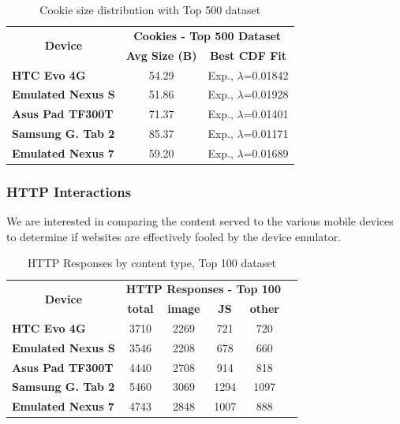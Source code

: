 \documentclass{acm_proc_article-sp}
\begin{document}
\begin{table}[htbp]
  \centering
  \caption{Cookie size distribution with Top 500 dataset}
    \begin{tabular}{|c|c|c|}
    \hline
    \multicolumn{1}{|c|}{\multirow{2}[4]{*}{\textbf{Device}}} & \multicolumn{2}{|c|}{\textbf{Cookies - Top 500 Dataset}} \\ \cline{2-3}
    \multicolumn{1}{|c|}{} & \textbf{Avg Size (B)} & \textbf{Best CDF Fit} \\ \hline
    \multicolumn{1}{|l|}{\textbf{HTC Evo 4G}} & 54.29 & Exp., $\lambda$=0.01842 \\
    \multicolumn{1}{|l|}{\textbf{Emulated Nexus S}} & 51.86 & Exp., $\lambda$=0.01928 \\
    \multicolumn{1}{|l|}{\textbf{Asus Pad TF300T}} & 71.37 & Exp., $\lambda$=0.01401 \\
    \multicolumn{1}{|l|}{\textbf{Samsung G. Tab 2}} & 85.37 & Exp., $\lambda$=0.01171 \\
    \multicolumn{1}{|l|}{\textbf{Emulated Nexus 7}} & 59.20 & Exp., $\lambda$=0.01689 \\ \hline
    \end{tabular}%
  \label{tab:cookie_sizes}%
\end{table}%

\subsubsection{HTTP Interactions}

We are interested in comparing the content served to the various mobile devices to determine if websites are effectively fooled by the device emulator.

\begin{table}[htbp]
  \centering
  \caption{HTTP Responses by content type, Top 100 dataset}
    \begin{tabular}{|c|c|c|c|c|c|}
    \hline
    \multicolumn{1}{|c|}{\multirow{2}[4]{*}{\textbf{Device}}} & \multicolumn{4}{|c|}{\textbf{HTTP Responses - Top 100}} \\ \cline{2-5}
    \multicolumn{1}{|c|}{} & \textbf{total} & \textbf{image} & \textbf{JS} & \textbf{other} \\ \hline
    \multicolumn{1}{|l|}{\textbf{HTC Evo 4G}} & 3710  & 2269  & 721   & 720 \\
    \multicolumn{1}{|l|}{\textbf{Emulated Nexus S}} & 3546  & 2208  & 678   & 660 \\
    \multicolumn{1}{|l|}{\textbf{Asus Pad TF300T}} & 4440  & 2708  & 914   & 818 \\
    \multicolumn{1}{|l|}{\textbf{Samsung G. Tab 2}} & 5460  & 3069  & 1294  & 1097 \\
    \multicolumn{1}{|l|}{\textbf{Emulated Nexus 7}} & 4743  & 2848  & 1007  & 888 \\ \hline
    \end{tabular}%
  \label{tab:addlabel}%
\end{table}%
\end{document}
